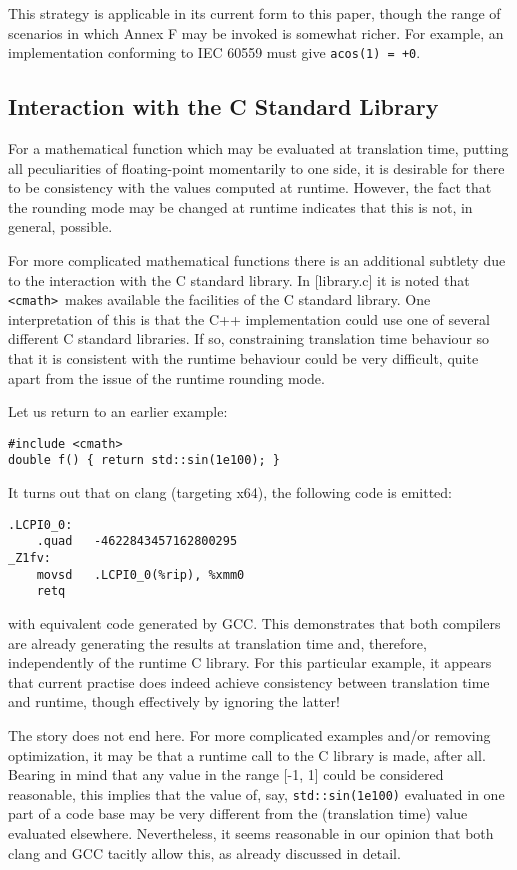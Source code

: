 \documentclass[prd,twocolumn,amsmath,amssymb,nofootinbib,eqsecnum]{revtex4-1}
\newcommand{\code}[1]{{\tt #1}}
\newcommand{\header}[1]{{\tt <#1>}}
\newcommand{\cmath}{\header{cmath}}
\begin{document}
This strategy is applicable in its current form to this paper, though the range of scenarios
in which Annex F may be invoked is somewhat richer. For example, an implementation
conforming to IEC 60559 must give \code{acos(1) = +0}.

\subsection{Interaction with the C Standard Library}

For a mathematical function which may be evaluated at translation time, 
putting all peculiarities of floating-point momentarily to one side, it is desirable for there to be
consistency with the values computed at runtime. However, the fact that the rounding mode
may be changed at runtime indicates that this is not, in general, possible. 

For more complicated mathematical functions there is an additional subtlety due
to the interaction with the C standard library. In [library.c] it is noted that \cmath\ makes available the facilities of the C standard library. One interpretation of this is that the C++
implementation could use one of several different C standard libraries. If so, 
constraining translation time behaviour so that it is consistent with the runtime behaviour
could be very difficult, quite apart from the issue of the runtime rounding mode.

Let us return to an earlier example:
\begin{Verbatim}
#include <cmath>
double f() { return std::sin(1e100); }
\end{Verbatim}
It turns out that on clang (targeting x64), the following code is emitted:
\begin{Verbatim}
.LCPI0_0:
	.quad	-4622843457162800295 
_Z1fv:
	movsd	.LCPI0_0(%rip), %xmm0
	retq
\end{Verbatim}
with equivalent code generated by GCC. This demonstrates that both compilers are already generating the results at translation time and, therefore, independently of the runtime C library. For this particular example, it appears that current practise does indeed achieve consistency between translation time and runtime, though effectively by ignoring the latter!

The story does not end here. For more complicated examples and/or removing optimization, it may be that a runtime call to the C library is made, after all. Bearing in mind that any value in the range [-1, 1] could be considered reasonable, this implies that the value of, say, \code{std::sin(1e100)} evaluated in one part of a code base may be very different from the (translation time) value evaluated elsewhere. 
Nevertheless, it seems reasonable in our opinion that both clang and GCC tacitly allow this, as already discussed in detail.
\end{document}
